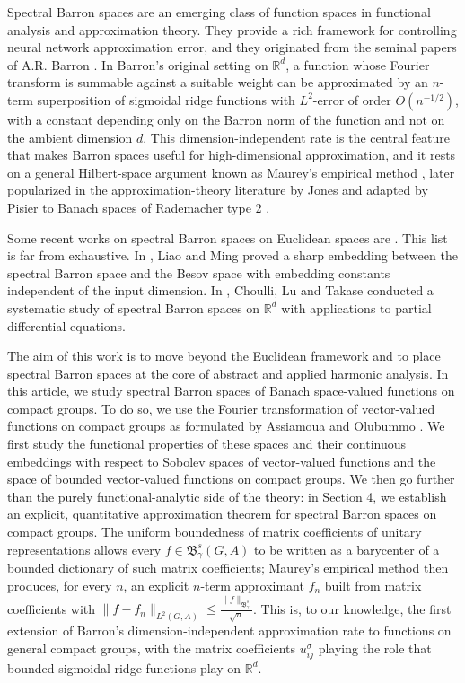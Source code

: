 \documentclass[12pt]{amsart}%
\begin{document}
Spectral Barron spaces are an emerging class of function spaces in
functional analysis and approximation theory. They provide a rich framework
for controlling neural network approximation error, and they originated
from the seminal papers of A.R. Barron \cite{Barron1993,Barron1994}. In
Barron's original setting on $\mathbb{R}^d$, a function whose Fourier
transform is summable against a suitable weight can be approximated by an
$n$-term superposition of sigmoidal ridge functions with $L^2$-error of
order $O(n^{-1/2})$, with a constant depending only on the Barron norm of
the function and not on the ambient dimension $d$. This
dimension-independent rate is the central feature that makes Barron spaces
useful for high-dimensional approximation, and it rests on a general
Hilbert-space argument known as Maurey's empirical method
\cite{Pisier1981}, later popularized in the approximation-theory literature
by Jones \cite{Jones1992} and adapted by Pisier to Banach spaces of
Rademacher type 2 \cite{Pisier1989}.
 
Some recent works on spectral Barron spaces on Euclidean spaces are
\cite{ChoulliLuTakase2025, FengLu2025, LiaoMing2025, SiegelXu2023}. This
list is far from exhaustive. In \cite{LiaoMing2025}, Liao and Ming proved a
sharp embedding between the spectral Barron space and the Besov space with
embedding constants independent of the input dimension. In
\cite{ChoulliLuTakase2025}, Choulli, Lu and Takase conducted a systematic
study of spectral Barron spaces on $\mathbb{R}^d$ with applications to
partial differential equations.
 
The aim of this work is to move beyond the Euclidean framework and to place
spectral Barron spaces at the core of abstract and applied harmonic
analysis. In this article, we study spectral Barron spaces of
Banach space-valued functions on compact groups. To do so, we use the
Fourier transformation of vector-valued functions on compact groups as
formulated by Assiamoua and Olubummo \cite{AssiamouaOlubummo1989}. We first
study the functional properties of these spaces and their continuous
embeddings with respect to Sobolev spaces of vector-valued functions and the
space of bounded vector-valued functions on compact groups. We then go
further than the purely functional-analytic side of the theory:
in Section 4, we establish an explicit, quantitative approximation theorem
for spectral Barron spaces on compact groups. The uniform boundedness of
matrix coefficients of unitary representations allows every $f \in \mathfrak{B}^s_\gamma(G,A)$ to be
written as a barycenter of a bounded dictionary of such matrix coefficients;
Maurey's empirical method then produces, for every $n$, an explicit
$n$-term approximant $f_n$ built from matrix coefficients with
$\|f-f_n\|_{L^2(G,A)} \le \frac{\|f\|_{\mathfrak{B}^s_\gamma}}{\sqrt n}$. This is, to our
knowledge, the first extension of Barron's dimension-independent
approximation rate to functions on general compact groups, with the matrix
coefficients $u^\sigma_{ij}$  playing the role that bounded
sigmoidal ridge functions play on $\mathbb{R}^d$.
 
\end{document}
